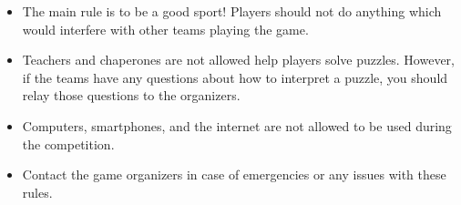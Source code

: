 \begin{rules}
\vfill

\newpage


\begin{itemize}
\item The main rule is to be a good sport! Players should not do anything which
would interfere with other teams playing the game.
\item Teachers and chaperones are not allowed help players solve puzzles. However,
if the teams have any questions about how to interpret a puzzle, you should relay
those questions to the organizers.
\item Computers, smartphones, and the internet are not allowed to be used during
the competition.
\item Contact the game organizers in case of emergencies
or any issues with these rules.
\end{itemize}

\end{rules}